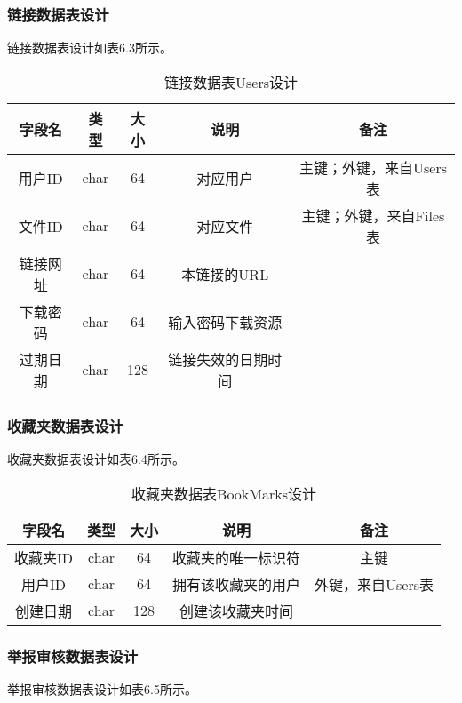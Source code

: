 \subsubsection{链接数据表设计}
链接数据表设计如表6.3所示。
\begin{table}[htbp]
\centering
\caption{链接数据表Users设计} \label{tab:link-database}
\begin{tabular}{|c|c|c|c|c|}
    \hline
    字段名 & 类型 & 大小 & 说明 & 备注 \\
    \hline
    用户ID & char & 64 & 对应用户 & 主键；外键，来自Users表\\
    \hline
    文件ID & char & 64 & 对应文件 & 主键；外键，来自Files表\\
    \hline
    链接网址 & char & 64 & 本链接的URL & \\
    \hline
    下载密码 & char & 64 & 输入密码下载资源 & \\
    \hline
    过期日期 & char & 128 & 链接失效的日期时间 & \\
    \hline 
\end{tabular}
\end{table}

\subsubsection{收藏夹数据表设计}
收藏夹数据表设计如表6.4所示。
\begin{table}[htbp]
\centering
\caption{收藏夹数据表BookMarks设计} \label{tab:bookmarks-database}
\begin{tabular}{|c|c|c|c|c|}
    \hline
    字段名 & 类型 & 大小 & 说明 & 备注 \\
    \hline
    收藏夹ID & char & 64 & 收藏夹的唯一标识符 & 主键\\
    \hline
    用户ID & char & 64 & 拥有该收藏夹的用户 & 外键，来自Users表\\
    \hline
    创建日期 & char & 128 & 创建该收藏夹时间 & \\
    \hline
\end{tabular}
\end{table}

\subsubsection{举报审核数据表设计}
举报审核数据表设计如表6.5所示。  
 
